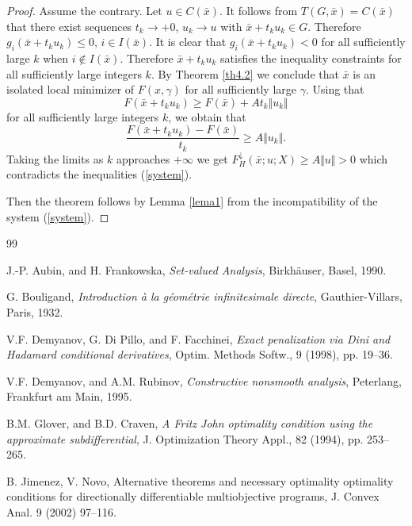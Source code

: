 \documentclass[12pt]{article}
\def\ld#1{#1^{\downarrow}_{H}}
\newcommand{\norm}[1]{\Vert#1\Vert}
\begin{document}
{\begin{proof}
Assume the contrary. Let $u\in C(\bar x)$. It follows from $T(G,\bar x)=C(\bar x)$ that there exist
sequences $t_k\to+0$, $u_k\to u$ with $\bar x+t_k u_k\in G$. Therefore
$g_i(\bar x+t_k u_k)\le 0$, $i\in I(\bar x)$. It is clear that
$g_i(\bar x+t_k u_k)< 0$ for all sufficiently large $k$ when
$i\notin I(\bar x)$. Therefore $\bar x+t_k u_k$ satisfies the inequality constraints for all
sufficiently large integers $k$. By Theorem \ref{th4.2} we conclude that $\bar x$ is an isolated local minimizer of $F(x,\gamma)$ for all sufficiently large $\gamma$.  Using that
\[
F(\bar x+t_k u_k)\ge F(\bar x)+A t_k\norm{u_k}
\]
for all sufficiently large integers $k$, we obtain that
\[
\frac{F(\bar x+t_k u_k)-F(\bar x)}{t_k}\ge A \norm{u_k}.
\]
Taking the limits as $k$ approaches $+\infty$ we get
$\ld F(\bar x;u;X)\ge A\norm{u}>0$
which contradicts the inequalities (\ref{system}). 

Then the theorem follows by Lemma \ref{lema1} from
the incompatibility of the system (\ref{system}).
\end{proof}






\begin{thebibliography}{99}

J.-P. Aubin, and H. Frankowska, {\itshape Set-valued Analysis},
Birkh\"auser, Basel, 1990.

 G. Bouligand, {\itshape Introduction \`a la g\'eom\'etrie
infinitesimale directe}, Gauthier-Villars, Paris, 1932.

 V.F. Demyanov, G. Di Pillo, and F.  Facchinei,
{\em Exact penalization via Dini and Hadamard conditional derivatives},
Optim. Methods Softw.,  9 (1998), pp. 19--36.

 V.F. Demyanov, and A.M. Rubinov, {\itshape Constructive
nonsmooth analysis}, Peterlang, Frankfurt am Main, 1995.


 B.M. Glover, and B.D. Craven, {\em A Fritz John
optimality condition using the approximate subdifferential},
J. Optimization Theory Appl.,  82 (1994), pp. 253--265.

 B. Jimenez, V. Novo,  Alternative theorems and necessary 
optimality optimality conditions for directionally differentiable multiobjective
programs, J. Convex Anal. 9 (2002) 97--116.


\end{thebibliography}}
\end{document}
